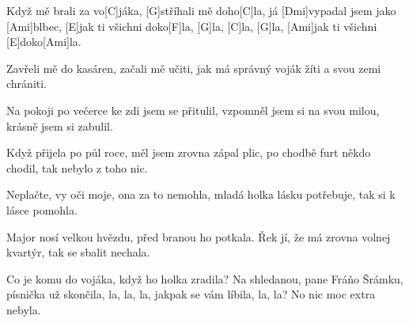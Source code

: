 
\sloka
[Ami]Když mě brali za vo[C]jáka,
[G]stříhali mě doho[C]la,
já [Dmi]vypadal jsem jako [Ami]blbec,
[E]jak ti všichni doko[F]la,
[G]la, [C]la, [G]la, [Ami]jak ti všichni [E]doko[Ami]la.

\sloka
Zavřeli mě do kasáren,
začali mě učiti,
jak má správný voják žíti
a svou zemi chrániti.

\sloka
Na pokoji po večerce
ke zdi jsem se přitulil,
vzpomněl jsem si na svou milou,
krásně jsem si zabulil.

\sloka
Když přijela po půl roce,
měl jsem zrovna zápal plic,
po chodbě furt někdo chodil,
tak nebylo z toho nic.

\sloka
Neplačte, vy oči moje,
ona za to nemohla,
mladá holka lásku potřebuje,
tak si k lásce pomohla.

\sloka
Major nosí velkou hvězdu,
před branou ho potkala.
Řek jí, že má zrovna volnej kvartýr,
tak se sbalit nechala.

\sloka
Co je komu do vojáka,
když ho holka zradila?
Na shledanou, pane Fráňo Šrámku,
písnička už skončila,
la, la, la, jakpak se vám líbila, la, la?
No nic moc extra nebyla. 
